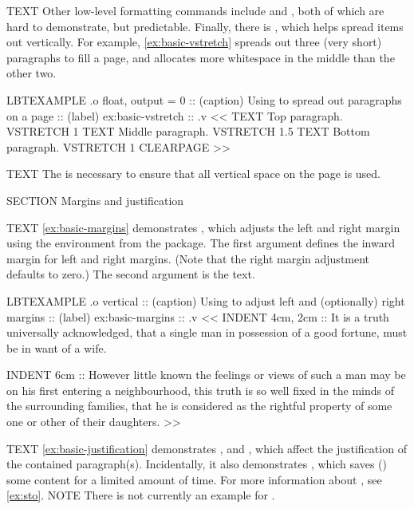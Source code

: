 \begin{lbt}
    TEXT Other low-level formatting commands include  and , both of which are hard to demonstrate, but predictable. Finally, there is , which helps spread items out vertically. For example, \cref{ex:basic-vstretch} spreads out three (very short) paragraphs to fill a page, and allocates more whitespace in the middle than the other two.

    LBTEXAMPLE .o float, output = 0
    :: (caption) Using  to spread out paragraphs on a page
    :: (label) ex:basic-vstretch
    :: .v <<
      TEXT Top paragraph.
      VSTRETCH 1
      TEXT Middle paragraph.
      VSTRETCH 1.5
      TEXT Bottom paragraph.
      VSTRETCH 1
      CLEARPAGE
    >>

    TEXT The  is necessary to ensure that all vertical space on the page is used.





    SECTION Margins and justification

    TEXT \cref{ex:basic-margins} demonstrates , which adjusts the left and right margin using the  environment from the  package. The first argument defines the inward margin for left and right margins. (Note that the right margin adjustment defaults to zero.) The second argument is the text.

    LBTEXAMPLE .o vertical
    :: (caption) Using  to adjust left and (optionally) right margins
    :: (label) ex:basic-margins
    :: .v <<
      INDENT 4cm, 2cm :: It is a truth universally acknowledged, that a single man in possession of a good fortune, must be in want of a wife.

      INDENT 6cm :: However little known the feelings or views of such a man may be on his first entering a neighbourhood, this truth is so well fixed in the minds of the surrounding families, that he is considered as the rightful property of some one or other of their daughters.
    >>

    TEXT \cref{ex:basic-justification} demonstrates ,  and , which affect the justification of the contained paragraph(s). Incidentally, it also demonstrates , which saves () some content for a limited amount of time. For more information about , see \cref{ex:sto}.
    NOTE There is not currently an example for .


\end{lbt}
